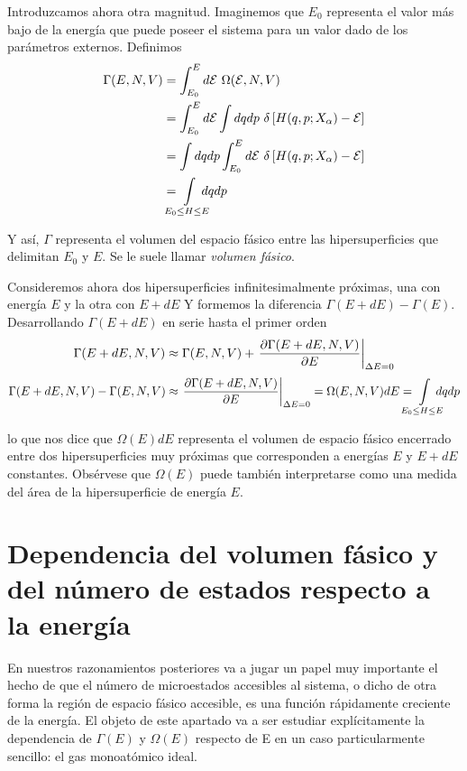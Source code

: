 Introduzcamos ahora otra magnitud. Imaginemos que $E_0$ representa el valor más bajo de la energía que puede
poseer el sistema para un valor dado de los parámetros externos. Definimos
\begin{align}
	\Gamma(E,N,V) &= \int_{E_0}^{E} d\mathcal{E} \ \Omega(\mathcal{E},N,V) \nonumber \\
	&= \int_{E_0}^{E} d\mathcal{E} \int dq dp \ \delta \left[ H(q,p;X_\alpha) - \mathcal{E} \right] \nonumber \\
	&= \int dq dp \int_{E_0}^{E} d\mathcal{E} \ \delta \left[ H(q,p;X_\alpha) - \mathcal{E} \right]\\
	&= \mkern-18mu \int\limits_{E_0 \le H \le E} \mkern-18mu dq dp \nonumber
\end{align}

Y así, $\Gamma$ representa el volumen del espacio fásico entre las hipersuperficies que delimitan $E_0$ y $E$. Se le suele llamar \emph{volumen fásico}.

Consideremos ahora dos hipersuperficies infinitesimalmente próximas, una con energía $E$ y la otra con $E + dE$ Y formemos la diferencia $\Gamma(E + dE) - \Gamma(E)$. Desarrollando $\Gamma(E + dE)$ en serie hasta el primer orden
$$\Gamma(E + dE,N,V) \approx \Gamma(E,N,V) + \eval{\pdv{\Gamma(E + dE,N,V)}{E}}_{\Delta E = 0} $$
$$\Gamma(E + dE,N,V) - \Gamma(E,N,V) \approx \eval{\pdv{\Gamma(E + dE,N,V)}{E}}_{\Delta E = 0} = \Omega(E,N,V) dE = \mkern-18mu \int\limits_{E_0 \le H \le E} \mkern-18mu dq dp$$

lo que nos dice que $\Omega(E) dE$ representa el volumen de espacio fásico encerrado entre dos hipersuperficies muy próximas que corresponden a energías $E$ y $E+dE$ constantes.
Obsérvese que $\Omega(E)$ puede también interpretarse como una medida del área de la hipersuperficie de energía $E$.

\section{Dependencia del volumen fásico y del número de estados respecto a la energía}

En nuestros razonamientos posteriores va a jugar un papel muy importante el hecho de que el número de microestados accesibles al sistema, o dicho de otra forma la región de espacio fásico accesible, es una función rápidamente creciente de la energía. 
El objeto de este apartado va a ser estudiar explícitamente la dependencia de $\Gamma(E)$ y $\Omega(E)$ respecto de E en un caso particularmente sencillo: el gas monoatómico ideal.

